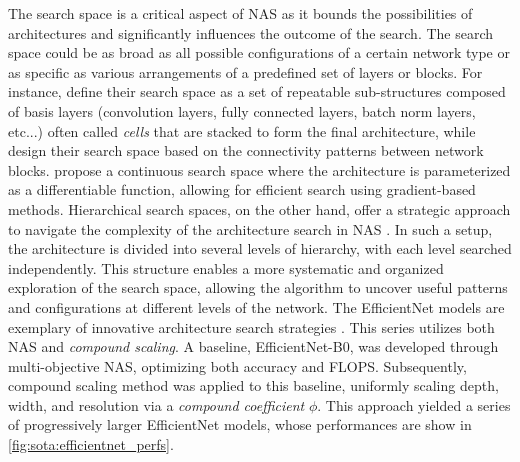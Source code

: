 The search space is a critical aspect of \ac{NAS} as it bounds the possibilities
of architectures and significantly influences the outcome of the search. The
search space could be as broad as all possible configurations of a certain
network type or as specific as various arrangements of a predefined set of
layers or blocks. For instance, \cite{DBLP:conf/iclr/ZophL17} define their
search space as a set of repeatable sub-structures composed of basis layers
(convolution layers, fully connected layers, \ac{batch norm} layers, etc...)
often called \emph{cells} that are stacked to form the final architecture, while
\cite{DBLP:conf/iclr/XieZLL19} design their search space based on the
connectivity patterns between network blocks. \cite{DBLP:conf/iclr/LiuSY19}
propose a continuous search space where the architecture is parameterized as a
differentiable function, allowing for efficient search using gradient-based
methods. Hierarchical search spaces, on the other hand, offer a strategic
approach to navigate the complexity of the architecture search in \ac{NAS}
\cite{DBLP:conf/cvpr/LiuCSAHY019,DBLP:conf/cvpr/TanCPVSHL19}. In such a setup,
the architecture is divided into several levels of hierarchy, with each level
searched independently. This structure enables a more systematic and organized
exploration of the search space, allowing the algorithm to uncover useful
patterns and configurations at different levels of the network. The EfficientNet
models are exemplary of innovative architecture search strategies
\cite{DBLP:conf/icml/TanL19}. This series utilizes both \ac{NAS} and
\emph{compound scaling}. A baseline, EfficientNet-B0, was developed through
multi-objective \ac{NAS}, optimizing both accuracy and FLOPS. Subsequently,
compound scaling method was applied to this baseline, uniformly scaling depth,
width, and resolution via a \emph{compound coefficient} $\phi$. This approach
yielded a series of progressively larger EfficientNet models, whose performances
are show in \ref{fig:sota:efficientnet_perfs}.\\


